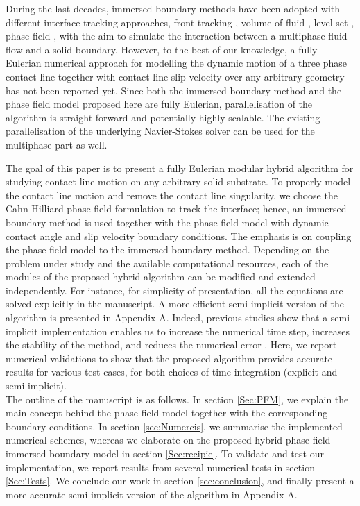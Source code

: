 \documentclass[review]{elsarticle}
\begin{document}
During the last decades, immersed boundary methods have been adopted with different interface tracking approaches, front-tracking \citep{DEEN20092186}, volume of fluid \citep{PATEL201728}, level set \citep{WANG201835}, phase field \citep{LIU2015484,Nishida2018}, with the aim to simulate the interaction between a multiphase fluid flow and
 a solid boundary. However, to the best of our knowledge, a fully Eulerian numerical approach for modelling the dynamic motion of a three phase contact line together with contact line slip velocity over any arbitrary geometry has not been reported yet. Since both the immersed boundary method and the phase field model proposed here are fully Eulerian, parallelisation of the algorithm is straight-forward and potentially highly scalable. The existing parallelisation of the underlying Navier-Stokes solver can be used for the multiphase part as well. 

The goal of this paper is to present a fully Eulerian modular hybrid algorithm for studying contact line motion on any arbitrary solid substrate. To properly model the contact line motion and remove the contact line singularity, we choose the Cahn-Hilliard phase-field formulation to track the interface; hence, an immersed boundary method is used together with the phase-field model with dynamic contact angle and slip velocity boundary conditions. The emphasis is on coupling the phase field model to the immersed boundary method.
 Depending on the problem under study and the available computational resources,  each of the modules of the proposed hybrid algorithm can be modified and extended independently. For instance, for simplicity of presentation, all the equations are solved explicitly in the manuscript. A more-efficient semi-implicit version of the algorithm is presented in Appendix A. Indeed, previous studies show that a semi-implicit implementation enables us to increase the numerical time step, increases the stability of the method, and reduces the numerical error \citep{DONG2012,SHEN2015,YU2017665,HUANG2020109192}. Here, we report numerical validations to show that the proposed algorithm provides accurate results for various test cases, for both choices of time integration (explicit and semi-implicit).\\  
 The outline of the manuscript is as follows. In section \ref{Sec:PFM}, we explain the main concept behind the phase field model together with the corresponding boundary conditions. In section \ref{sec:Numercis}, we summarise the implemented numerical schemes, whereas we elaborate on the proposed hybrid phase field-immersed boundary model in section \ref{Sec:recipie}. To validate and test our implementation, we report results from several numerical tests in section \ref{Sec:Tests}. We conclude our work in section \ref{sec:conclusion}, and finally present a more accurate semi-implicit version of the algorithm in Appendix A.
\end{document}
